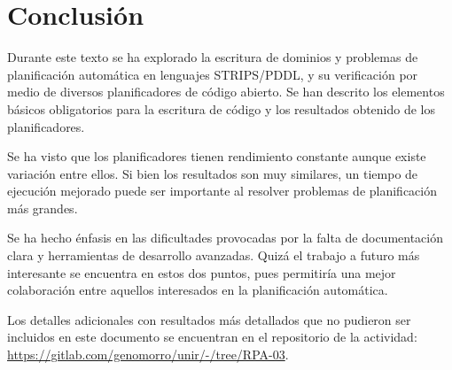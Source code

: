 \documentclass[a4paper,12pt]{article}
\begin{document}




\section{Conclusión}

Durante este texto se ha explorado la escritura de dominios y problemas de planificación automática en lenguajes STRIPS/PDDL, y su verificación por medio de diversos planificadores de código abierto. Se han descrito los elementos básicos obligatorios para la escritura de código y los resultados obtenido de los planificadores.

Se ha visto que los planificadores tienen rendimiento constante aunque existe variación entre ellos. Si bien los resultados son muy similares, un tiempo de ejecución mejorado puede ser importante al resolver problemas de planificación más grandes.

Se ha hecho énfasis en las dificultades provocadas por la falta de documentación clara y herramientas de desarrollo avanzadas. Quizá el trabajo a futuro más interesante se encuentra en estos dos puntos, pues permitiría una mejor colaboración entre aquellos interesados en la planificación automática.

Los detalles adicionales con resultados más detallados que no pudieron ser incluidos en este documento se encuentran en el repositorio de la actividad: \href{https://gitlab.com/genomorro/unir/-/tree/RPA-03}{https://gitlab.com/genomorro/unir/-/tree/RPA-03}.



\end{document}
